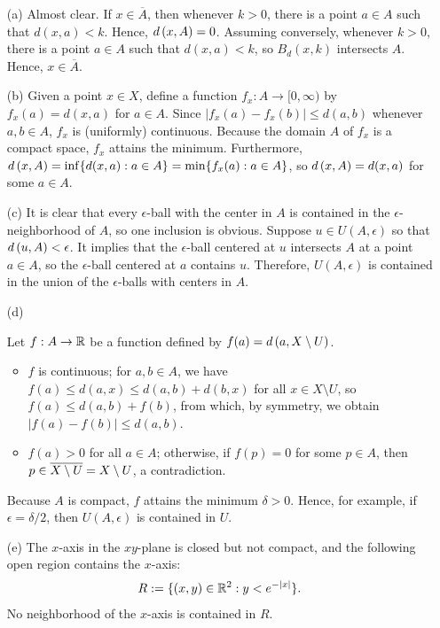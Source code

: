 \begin{sol}
    \begin{enumerate}
        \item[(a)]
        {    
            Almost clear.
            If $x\in\overline{A}$, then whenever $k>0$, there is a point $a\in A$ such that $d(x, a)<k$.
            Hence, ${d}\left({x},{A}\right)=0$.
            Assuming conversely, whenever $k>0$, there is a point $a\in A$ such that $d(x, a)<k$, so $B_d(x, k)$ intersects $A$.
            Hence, $x\in\overline{A}$.
        }
        \item[(b)]
        {
            Given a point $x\in X$, define a function $f_x: A\rightarrow[0, \infty)$ by $f_x(a)=d(x, a)$ for $a\in A$.
            Since $|f_x(a)-f_x(b)|\leq d(a, b)$ whenever $a, b\in A$, $f_x$ is (uniformly) continuous.
            Because the domain $A$ of $f_x$ is a compact space, $f_x$ attains the minimum.
            Furthermore, ${d}\left({x},{A}\right)=\inf\{d(x, a): a\in A\}=\min\{f_x(a): a\in A\}$, so ${d}\left({x},{A}\right)=d(x, a)$ for some $a\in A$.
        }
        \item[(c)]
        {
            It is clear that every $\epsilon$-ball with the center in $A$ is contained in the $\epsilon$-neighborhood of $A$, so one inclusion is obvious.
            Suppose $u\in U(A, \epsilon)$ so that ${d}\left({u},{A}\right)<\epsilon$.
            It implies that the $\epsilon$-ball centered at $u$ intersects $A$ at a point $a\in A$, so the $\epsilon$-ball centered at $a$ contains $u$.
            Therefore, $U(A, \epsilon)$ is contained in the union of the $\epsilon$-balls with centers in $A$.
        }
        \item[(d)]
        {    
            Let $f: A\rightarrow {\mathbb{R}}$ be a function defined by $f(a)={d}\left({a},{X\setminus U}\right)$.
            \begin{itemize}
                \item
                {
                    $f$ is continuous; for $a, b\in A$, we have $f(a)\leq d(a, x)\leq d(a, b)+d(b, x)$ for all $x\in X\setminus U$, so $f(a)\leq d(a, b)+f(b)$, from which, by symmetry, we obtain $|f(a)-f(b)|\leq d(a, b)$.
                }
                \item
                {
                    $f(a)>0$ for all $a\in A$; otherwise, if $f(p)=0$ for some $p\in A$, then $p\in\overline{X\setminus U}=X\setminus U$, a contradiction.
                }
            \end{itemize}
            Because $A$ is compact, $f$ attains the minimum $\delta>0$.
            Hence, for example, if $\epsilon=\delta/2$, then $U(A, \epsilon)$ is contained in $U$.
        }
        \item[(e)]
        {
            The $x$-axis in the $xy$-plane is closed but not compact, and the following open region contains the $x$-axis:
            \begin{align*}
                R:=\{(x, y)\in{\mathbb{R}}^2: y<e^{-|x|}\}.
            \end{align*}
            No neighborhood of the $x$-axis is contained in $R$.
        }
    \end{enumerate}
\end{sol}


